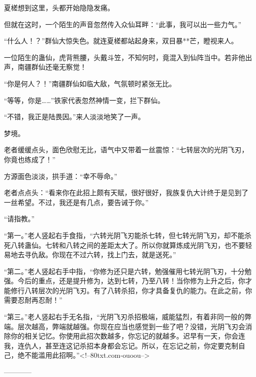 \begin{this_body}
夏槎想到这里，头都开始隐隐发痛。

但就在这时，一个陌生的声音忽然传入众仙耳畔：“此事，我可以出一些力气。”

“什么人！？”群仙大惊失色。就连夏槎都站起身来，双目暴**芒，瞪视来人。

一位陌生的蛊仙，虎背熊腰，头戴斗笠，不知何时，竟混入到仙阵当中。若非他出声，南疆群仙还毫无察觉！

“你是何人？！”南疆群仙如临大敌，气氛顿时紧张无比。

“等等，你是……”铁家代表忽然神情一变，拦下群仙。

“不错，我正是陆畏因。”来人淡淡地笑了一声。

梦境。

老者缓缓点头，面色欣慰无比，语气中又带着一丝震惊：“七转层次的光阴飞刃，你竟也练成了！”

方源面色淡淡，拱手道：“幸不辱命。”

老者点点头：“看来你在此招上颇有天赋，很好很好，我族复仇大计终于是见到了一丝希望。不过，我还是有几点，要告诫于你。”

“请指教。”

“第一。”老人竖起右手食指，“六转光阴飞刃能杀七转，但七转光阴飞刃，却不能杀死八转蛊仙。七转和八转之间的差距太大了。所以你就算炼成光阴飞刃，也不要轻易地去寻仇敌。你现在不过六转，找上门去，就是送死。”

“第二。”老人竖起右手中指，“你修为还只是六转，勉强催用七转光阴飞刃，十分勉强。今后的重点，还是提升修为，达到七转，乃至八转！当你修为上升之后，你才能修行八转层次的光阴飞刃。有了八转杀招，你才具备复仇的能力。在此之前，你需要忍耐再忍耐！”

“第三。”老人竖起右手无名指，“光阴飞刃杀招极端，威能猛烈，有着非同一般的弊端。层次越高，弊端就越强。你现在应当也感觉到一些了吧？没错，光阴飞刃会消除你的相关记忆。你使用此招次数越多，你忘记的就越多。迟早有一天，你会连我，连仇人，甚至连这记杀招本身都会忘记。所以，在忘记之前，你定要克制自己，绝不能滥用此招啊。”<!--80txt.com-ouoou-->

------------

\end{this_body}

